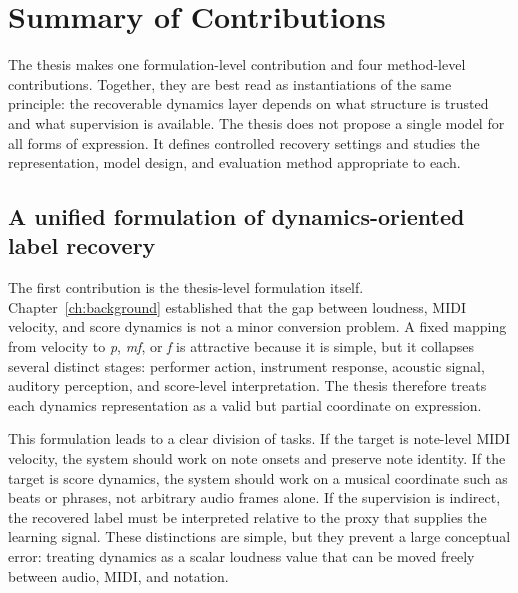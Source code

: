 \section{Summary of Contributions}
\label{sec:conclusion:contrib}

The thesis makes one formulation-level contribution and four method-level contributions. Together, they are best read as instantiations of the same principle: the recoverable dynamics layer depends on what structure is trusted and what supervision is available. The thesis does not propose a single model for all forms of expression. It defines controlled recovery settings and studies the representation, model design, and evaluation method appropriate to each.

\subsection{A unified formulation of dynamics-oriented label recovery}
\label{ssec:conclusion:formulation}

The first contribution is the thesis-level formulation itself. Chapter~\ref{ch:background} established that the gap between loudness, MIDI velocity, and score dynamics is not a minor conversion problem. A fixed mapping from velocity to \textit{p}, \textit{mf}, or \textit{f} is attractive because it is simple, but it collapses several distinct stages: performer action, instrument response, acoustic signal, auditory perception, and score-level interpretation. The thesis therefore treats each dynamics representation as a valid but partial coordinate on expression.

This formulation leads to a clear division of tasks. If the target is note-level MIDI velocity, the system should work on note onsets and preserve note identity. If the target is score dynamics, the system should work on a musical coordinate such as beats or phrases, not arbitrary audio frames alone. If the supervision is indirect, the recovered label must be interpreted relative to the proxy that supplies the learning signal. These distinctions are simple, but they prevent a large conceptual error: treating dynamics as a scalar loudness value that can be moved freely between audio, MIDI, and notation.

